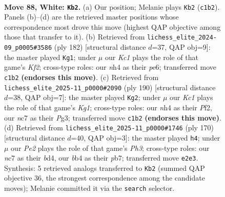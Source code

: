 \documentclass[11pt]{article}
\begin{document}
\clearpage

\begin{figure}[p]\centering
\begin{subfigure}{0.46\textwidth}\centering
\resizebox{\linewidth}{!}{%
\newchessgame
\chessboard[
  setfen={8/1Nn5/5k2/p7/Pb1pP2n/1P1B3p/4P3/2K5 w - - 42 88},
  showmover=false,
  pgfstyle=straightmove, color=movearrow, markmove={c1-b2}
]}
\caption{}
\end{subfigure}\hfill
\begin{subfigure}{0.46\textwidth}\centering
\resizebox{\linewidth}{!}{%
\newchessgame
\chessboard[
  setfen={8/5k2/p3p3/Pb2P1Bp/1P5P/8/5K2/8 w - - 64 92},
  showmover=false,
  pgfstyle=straightmove, color=movearrow, markmove={f2-g1}
]}
\caption{}
\end{subfigure}
\\[4pt]
\begin{subfigure}{0.46\textwidth}\centering
\resizebox{\linewidth}{!}{%
\newchessgame
\chessboard[
  setfen={8/8/1B6/P6p/1k2p1p1/3bP1P1/5P2/6K1 w - - 70 96},
  showmover=false,
  pgfstyle=straightmove, color=movearrow, markmove={g1-g2}
]}
\caption{}
\end{subfigure}\hfill
\begin{subfigure}{0.46\textwidth}\centering
\resizebox{\linewidth}{!}{%
\newchessgame
\chessboard[
  setfen={8/1p6/1p1k4/3P3p/KPPb1p2/7P/8/7B w - - 0 86},
  showmover=false,
  pgfstyle=straightmove, color=movearrow, markmove={h3-h4}
]}
\caption{}
\end{subfigure}
\caption{\textbf{Move 88, White: \texttt{Kb2}.} (a) Our position; Melanie plays \texttt{Kb2} (\texttt{c1b2}). Panels (b)--(d) are the retrieved master positions whose correspondence most drove this move (highest QAP objective among those that transfer to it). (b) Retrieved from \texttt{lichess\_elite\_2024-09\_p0005\#3586} (ply 182) [structural distance $d$=37, QAP obj=9]: the master played \texttt{Kg1}; under $\mu$ our \emph{Kc1} plays the role of that game's \emph{Kf2}; cross-type roles: our \emph{n}h4 as their \emph{p}e6; transferred move \texttt{c1b2} \textbf{(endorses this move)}. (c) Retrieved from \texttt{lichess\_elite\_2025-11\_p0000\#2090} (ply 190) [structural distance $d$=38, QAP obj=7]: the master played \texttt{Kg2}; under $\mu$ our \emph{Kc1} plays the role of that game's \emph{Kg1}; cross-type roles: our \emph{n}h4 as their \emph{P}f2, our \emph{n}c7 as their \emph{P}g3; transferred move \texttt{c1b2} \textbf{(endorses this move)}. (d) Retrieved from \texttt{lichess\_elite\_2025-11\_p0000\#1746} (ply 170) [structural distance $d$=40, QAP obj=3]: the master played \texttt{h4}; under $\mu$ our \emph{Pe2} plays the role of that game's \emph{Ph3}; cross-type roles: our \emph{n}c7 as their \emph{b}d4, our \emph{b}b4 as their \emph{p}b7; transferred move \texttt{e2e3}. Synthesis: 5 retrieved analogs transferred to \texttt{Kb2} (summed QAP objective 36, the strongest correspondence among the candidate moves); Melanie committed it via the \texttt{search} selector.}
\label{fig:thought-m174}
\end{figure}
\end{document}
